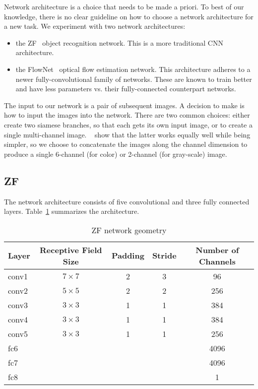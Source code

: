 Network architecture is a choice that needs to be made a priori.  To
best of our knowledge, there is no clear guideline on how to choose a
network architecture for a new task.  We experiment with two network architectures:

\begin{itemize}
\item the ZF~\cite{DBLP:journals/corr/ZeilerF13} object recognition
  network.  This is a more traditional CNN architecture.
\item the FlowNet~\cite{fischer2015flownet} optical flow estimation
  network.  This architecture adheres to a newer fully-convolutional
  family of networks.  These are known to train better and have less
  parameters vs. their fully-connected counterpart networks.
\end{itemize}

The input to our network is a pair of subsequent images.  A decision
to make is how to input the images into the network.  There are two
common choices: either create two siamese branches, so that each gets
its own input image, or to create a single multi-channel image.
~\cite{fischer2015flownet} show that the latter works equally well
while being simpler, so we choose to concatenate the images along the
channel dimension to produce a single 6-channel (for color) or
2-channel (for gray-scale) image.

\subsection{ZF}

The network architecture consists of five convolutional and three fully connected layers.  Table~\ref{tab:zf_geometry} summarizes the architecture.

\begin{table}[ht]
  \begin{tabular}{lcccc}
    \toprule
    \textbf{Layer} & \textbf{Receptive Field Size} & \textbf{Padding} & \textbf{Stride} & \textbf{Number of Channels}\\
    \midrule
    conv1&  $7\times 7$& 2& 3&   96\\
    conv2&  $5\times 5$& 2& 2&  256\\
    conv3&  $3\times 3$& 1& 1&  384\\
    conv4&  $3\times 3$& 1& 1&  384\\
    conv5&  $3\times 3$& 1& 1&  256\\
    fc6&               &  &  & 4096\\
    fc7&               &  &  & 4096\\
    fc8&               &  &  &    1\\
  \end{tabular}
  \caption{ZF network geometry}
  \label{tab:zf_geometry}
\end{table}


